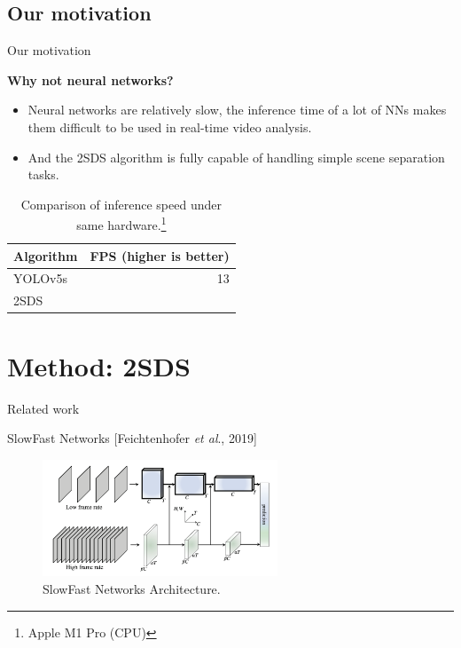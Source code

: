 \documentclass[aspectratio=43,display]{beamer}
\begin{document}
	\subsection{Our motivation}

		\begin{frame}{Our motivation}

			\textbf{Why not neural networks?}

			\begin{itemize}
				\item Neural networks are relatively slow, the inference time of a lot of NNs makes them difficult to be used in real-time video analysis.
				\item And the 2SDS algorithm is fully capable of handling simple scene separation tasks.
			\end{itemize}

			\vskip 0.3cm

			\begin{table}
				\centering
				\begin{tabular}{l|r}
				Algorithm & FPS (higher is better) \\\hline
				YOLOv5s & 13 \\
				2SDS & 
				\end{tabular}
			\caption{\label{tab:widgets}Comparison of inference speed under same hardware.\footnote{Apple M1 Pro (CPU)}}
			\end{table}


		\end{frame}


	\section{Method: 2SDS}

		\begin{frame}{Related work}

			SlowFast Networks [Feichtenhofer \textit{et al}., 2019]

			\begin{figure}
				\includegraphics[width=7cm]{images/slowfast-networks.png}
				\caption{\label{fig:SlowFast-Networks}SlowFast Networks Architecture.}
			\end{figure}

		\end{frame}
		
\end{document}

